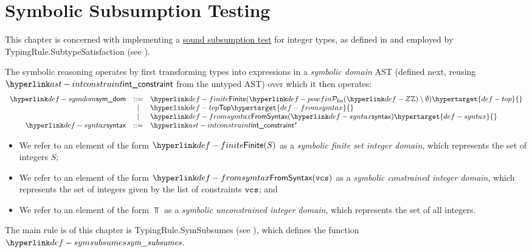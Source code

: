 \chapter{Symbolic Subsumption Testing\label{chap:SymbolicSubsumptionTesting}}
This chapter is concerned with implementing a \hyperlink{def-soundsubsumptiontest}{sound subsumption test}
for integer types, as defined in  and employed by
TypingRule.SubtypeSatisfaction (see ).

\hypertarget{def-symbolicdomain}{}
The symbolic reasoning operates by first transforming types into expressions in a \emph{symbolic domain} AST
(defined next, reusing $\intconstraint$ from the untyped AST) over which it then operates:
\hypertarget{def-symdom}{}
\hypertarget{def-finite}{}
\[
  \begin{array}{rcl}
    \symdom &::=& \Finite(\powfin{\Z} \setminus \emptyset) \hypertarget{def-top}{}\\
            &|  & \Top                      \hypertarget{def-fromsymtax}{}\\
            &|  & \FromSyntax(\syntax)      \hypertarget{def-syntax}{}\\
    \syntax &::=& \intconstraint^*
  \end{array}
\]

\begin{itemize}
  \item We refer to an element of the form $\Finite(S)$ as a \emph{symbolic finite set integer domain},
        which represents the set of integers $S$;
  \item We refer to an element of the form $\FromSyntax(\vcs)$ as a \emph{symbolic constrained integer domain},
        which represents the set of integers given by the list of constraints $\texttt{vcs}$; and
  \item We refer to an element of the form $\Top$ as a \emph{symbolic unconstrained integer domain},
        which represents the set of all integers.
\end{itemize}

The main rule is of this chapter is TypingRule.SymSubsumes (see ), which defines the function
$\symsubsumes$.

